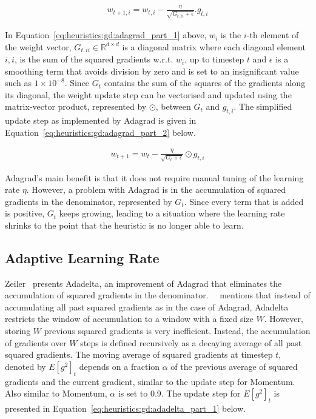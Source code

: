 \begin{equation}
      \label{eq:heuristics:gd:adagrad_part_1}
      \begin{split}
            w_{t+1,i} = w_{t,i} - \frac{\eta}{\sqrt{G_{t,ii} + \epsilon}}.g_{t,i}
      \end{split}
\end{equation}

\noindent
In Equation~\eqref{eq:heuristics:gd:adagrad_part_1} above, $w_{i}$ is the $i$-th element of the weight vector, $G_{t,ii} \in \mathbb{R}^{d \times d}$ is a diagonal matrix where each diagonal element $i,i$, is the sum of the squared gradients w.r.t. $w_{i}$, up to timestep $t$ and $\epsilon$ is a smoothing term that avoids division by zero and is set to an insignificant value such as $1 \times 10^{-8}$. Since $G_{t}$ contains the sum of the squares of the gradients along its diagonal, the weight update step can be vectorised and updated using the matrix-vector product, represented by $\odot$, between $G_{t}$ and $g_{t,i}$. The simplified update step as implemented by \acs{Adagrad} is given in Equation~\eqref{eq:heuristics:gd:adagrad_part_2} below.

\begin{equation}
      \label{eq:heuristics:gd:adagrad_part_2}
      \begin{split}
            w_{t+1} = w_{t} - \frac{\eta}{\sqrt{G_{t} + \epsilon}} \odot g_{t,i}
      \end{split}
\end{equation}

\noindent
\Ac{Adagrad}'s main benefit is that it does not require manual tuning of the learning rate $\eta$. However, a problem with \acs{Adagrad} is in the accumulation of squared gradients in the denominator, represented by $G_{t}$. Since every term that is added is positive, $G_{t}$ keeps growing, leading to a situation where the learning rate shrinks to the point that the heuristic is no longer able to learn.

\subsection{Adaptive Learning Rate}\label{sec:heuristics:adadelta}

Zeiler~\cite{ref:zeiler:2012} presents \acs{Adadelta}, an improvement of \acs{Adagrad} that eliminates the accumulation of squared gradients in the denominator.~\citeauthor{ref:ruder:2016}~\cite{ref:ruder:2016} mentions that instead of accumulating all past squared gradients as in the case of \acs{Adagrad}, \acs{Adadelta} restricts the window of accumulation to a window with a fixed size $W$. However, storing $W$ previous squared gradients is very inefficient. Instead, the accumulation of gradients over $W$ steps is defined recursively as a decaying average of all past squared gradients. The moving average of squared gradients at timestep $t$, denoted by $E[g^{2}]_{t}$  depends on a fraction $\alpha$ of the previous average of squared gradients and the current gradient, similar to the update step for \acs{Momentum}. Also similar to \acs{Momentum}, $\alpha$ is set to 0.9. The update step for $E[g^{2}]_{t}$ is presented in Equation~\eqref{eq:heuristics:gd:adadelta_part_1} below.

